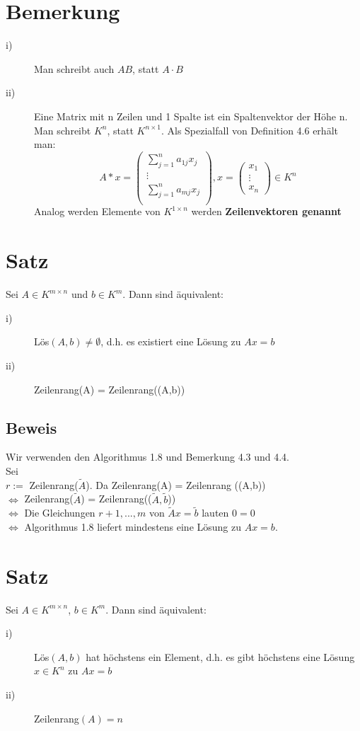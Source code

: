 \documentclass{scrbook}
\begin{document}
\section{Bemerkung}
\begin{description}
\item[i)] Man schreibt auch $AB$, statt $A\cdot B$
\item[ii)]Eine Matrix mit n Zeilen und 1 Spalte ist ein Spaltenvektor der Höhe n. Man schreibt $K^n$, statt $K^{n\times 1}$. Als Spezialfall von Definition 4.6 erhält man:\[
A*x=\left(
\begin{array}{c}
\sum^n_{j=1}a_{1j}x_j\\
\vdots\\
\sum^n_{j=1}a_{mj}x_j\\
\end{array}
\right), x= \left(
\begin{array}{c}
x_1\\\vdots\\x_n
\end{array}
\right) \in K^n
\]
Analog werden Elemente von $K^{1\times n}$ werden \textbf{Zeilenvektoren genannt}
\end{description}
\section{Satz}
Sei $A\in K^{m \times n}$ und $b \in K ^m$. Dann sind äquivalent:
\begin{description}
\item[i)] Lös$(A,b)\neq \emptyset$, d.h. es existiert eine Lösung zu $Ax=b$ 
\item[ii)] Zeilenrang(A) = Zeilenrang((A,b))
\end{description}
\subsection*{Beweis}
Wir verwenden den Algorithmus 1.8 und Bemerkung 4.3 und 4.4.\\
Sei \\$r :=$ Zeilenrang($\tilde{A}$). Da Zeilenrang(A) = Zeilenrang ((A,b))\\ $\Leftrightarrow$ Zeilenrang($\tilde{A}$) = Zeilenrang(($\tilde{A},\tilde{b}$)) \\$\Leftrightarrow$ Die Gleichungen $r+1,...,m$ von $\tilde{A}x = \tilde{b}$ lauten $0=0$ \\$\Leftrightarrow$ Algorithmus 1.8 liefert mindestens eine Lösung zu $Ax=b$.
\section{Satz}
Sei $A \in K^{m\times n}$, $b \in K^m$. Dann sind äquivalent:
\begin{description}
\item[i)] Lös$(A,b)$ hat höchstens ein Element, d.h. es gibt höchstens eine Lösung $x \in K^n $ zu $Ax=b$
\item[ii)] Zeilenrang$(A)=n$
\end{description}
\end{document}
